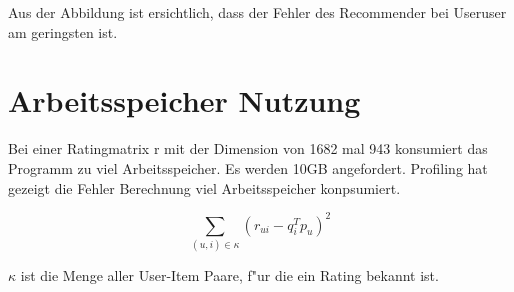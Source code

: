 \documentclass[a4paper, 11pt]{article}
\begin{document}

Aus der Abbildung ist ersichtlich, dass der Fehler des Recommender bei Useruser am geringsten ist.

\section{Arbeitsspeicher Nutzung}
\label{sec:ram}

Bei einer Ratingmatrix r mit der Dimension von 1682 mal 943 konsumiert das Programm zu viel Arbeitsspeicher. Es werden 10GB angefordert. Profiling hat gezeigt die Fehler Berechnung viel Arbeitsspeicher konpsumiert.

\begin{equation}
  \label{eq:squareerror}
  \sum_{(u,i) \in \kappa} (r_{ui} - q_i^T p_u)^2
\end{equation}

$\kappa$ ist die Menge aller User-Item Paare, f"ur die ein Rating bekannt ist.



\end{document}
